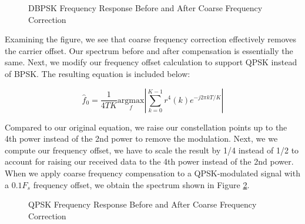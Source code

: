 \documentclass{article}
\begin{document}
\begin{figure}[H]
	\centerline{}
	\caption{DBPSK Frequency Response Before and After Coarse Frequency Correction}
	\label{fig::psd_bpsk_with_cfc}
\end{figure}

\noindent Examining the figure, we see that coarse frequency correction effectively removes the carrier offset. Our spectrum before and after compensation is essentially the same. Next, we modify our frequency offset calculation to support QPSK instead of BPSK. The resulting equation is included below:

\begin{equation}
	\hat{f}_0 = \frac{1}{4TK}\underset{f}{\text{argmax}}\left\vert\sum_{k=0}^{K-1}{r^4(k)e^{-j2{\pi}kT/K}}\right\vert
\end{equation}

\noindent Compared to our original equation, we raise our constellation points up to the 4th power instead of the 2nd power to remove the modulation. Next, we we compute our frequency offset, we have to scale the result by 1/4 instead of 1/2 to account for raising our received data to the 4th power instead of the 2nd power. When we apply coarse frequency compensation to a QPSK-modulated signal with a $0.1F_s$ frequency offset, we obtain the spectrum shown in Figure \ref{fig::psd_qpsk_with_cfc}.
 
\begin{figure}[H]
	\centerline{}
	\caption{QPSK Frequency Response Before and After Coarse Frequency Correction}
	\label{fig::psd_qpsk_with_cfc}
\end{figure}
\end{document}

